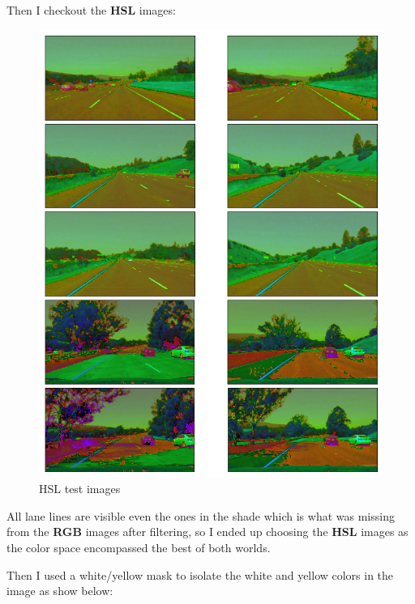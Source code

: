 \documentclass[11pt]{article}
\makeatletter
\def\maxwidth{\ifdim\Gin@nat@width>\linewidth\linewidth
    \else\Gin@nat@width\fi}
\let\Oldincludegraphics\includegraphics
\renewcommand{\includegraphics}[1]{\Oldincludegraphics[width=.8\maxwidth]{#1}}
\makeatother
\begin{document}
Then I checkout the \textbf{HSL} images:

\begin{figure}
\centering
\includegraphics{test_images_output/hsl_test_images.png}
\caption{HSL test images}
\end{figure}

All lane lines are visible even the ones in the shade which is what was
missing from the \textbf{RGB} images after filtering, so I ended up
choosing the \textbf{HSL} images as the color space encompassed the best
of both worlds.

Then I used a white/yellow mask to isolate the white and yellow colors
in the image as show below:
\end{document}
